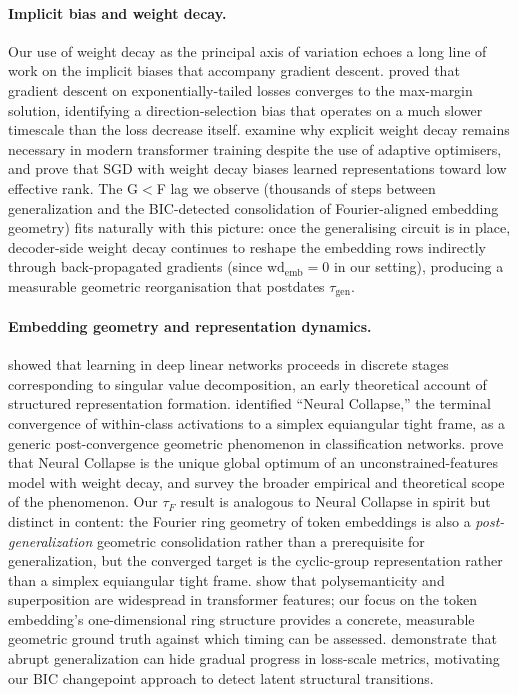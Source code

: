 \documentclass{article}
\newcommand{\taug}{\tau_{\mathrm{gen}}}
\newcommand{\tauf}{\tau_{F}}
\begin{document}
\paragraph{Implicit bias and weight decay.}
Our use of weight decay as the principal axis of variation echoes a
long line of work on the implicit biases that accompany gradient
descent.
\citet{soudry2018implicit} proved that gradient descent on
exponentially-tailed losses converges to the max-margin solution,
identifying a direction-selection bias that operates on a much slower
timescale than the loss decrease itself.
\citet{andriushchenko2023need} examine why explicit weight decay
remains necessary in modern transformer training despite the use of
adaptive optimisers, and \citet{galanti2024sgd} prove that SGD with
weight decay biases learned representations toward low effective rank.
The G$<$F lag we observe (thousands of steps between generalization
and the BIC-detected consolidation of Fourier-aligned embedding
geometry)
fits naturally with this picture: once the generalising circuit
is in place, decoder-side weight decay continues to reshape the
embedding rows indirectly through back-propagated gradients
(since $\mathrm{wd}_{\mathrm{emb}}{=}0$ in our setting),
producing a measurable geometric reorganisation that postdates
$\taug$.

\paragraph{Embedding geometry and representation dynamics.}
\citet{saxe2014exact} showed that learning in deep linear networks
proceeds in discrete stages corresponding to singular value
decomposition, an early theoretical account of structured
representation formation.
\citet{papyan2020prevalence} identified ``Neural Collapse,'' the
terminal convergence of within-class activations to a simplex
equiangular tight frame, as a generic post-convergence geometric
phenomenon in classification networks.
\citet{zhu2021geometric} prove that Neural Collapse is the unique
global optimum of an unconstrained-features model with weight decay,
and \citet{kothapalli2023neural} survey the broader empirical and
theoretical scope of the phenomenon.
Our $\tauf$ result is analogous to Neural Collapse in spirit but
distinct in content: the Fourier ring geometry of token embeddings
is also a \emph{post-generalization} geometric consolidation rather
than a prerequisite for generalization, but the converged target is
the cyclic-group representation rather than a simplex equiangular
tight frame.
\citet{elhage2022toy} show that polysemanticity and superposition
are widespread in transformer features; our focus on the token
embedding's one-dimensional ring structure provides a concrete,
measurable geometric ground truth against which timing can be assessed.
\citet{barak2022hidden} demonstrate that abrupt generalization can
hide gradual progress in loss-scale metrics, motivating our
BIC changepoint approach to detect latent structural transitions.
\end{document}
